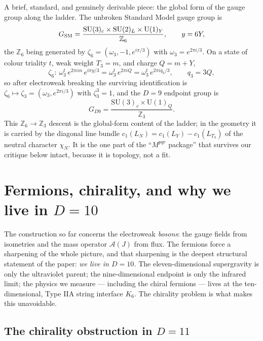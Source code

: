 \documentclass[11pt]{article}
\theoremstyle{plain}
\theoremstyle{definition}
\newcommand{\cA}{\mathcal{A}}
\newcommand{\Z}{\mathbb{Z}}
\newcommand{\SU}{\mathrm{SU}}
\newcommand{\U}{\mathrm{U}}
\begin{document}
A brief, standard, and genuinely derivable piece: the global form of the
gauge group along the ladder. The unbroken Standard Model gauge group is
\begin{equation}
G_{\rm SM}=\frac{\SU(3)_c\times\SU(2)_L\times\U(1)_Y}{\Z_6},
\qquad y=6Y,
\end{equation}
the $\Z_6$ being generated by
$\zeta_6=(\omega_3,-1,e^{i\pi/3})$ with $\omega_3=e^{2\pi i/3}$. On a state
of colour triality $t$, weak weight $T_3=m$, and charge $Q=m+Y$,
\begin{equation}
\zeta_6:\ \omega_3^{t}\,e^{2\pi i m}\,e^{i\pi y/3}
=\omega_3^{t}\,e^{2\pi i Q}
=\omega_3^{t}\,e^{2\pi i q_3/3},\qquad q_3=3Q,
\end{equation}
so after electroweak breaking the surviving identification is
$\zeta_6\mapsto\zeta_3=(\omega_3,e^{2\pi i/3})$ with $\zeta_3^3=1$, and the
$D=9$ endpoint group is
\begin{equation}
G_{D9}=\frac{\SU(3)_c\times\U(1)_Q}{\Z_3}.
\end{equation}
This $\Z_6\to\Z_3$ descent is the global-form content of the ladder; in the
geometry it is carried by the diagonal line bundle
$c_1(L_N)=c_1(L_Y)-c_1(L_{T_3})$ of the neutral character $\chi_N$. It is
the one part of the ``$M^{pqr}$ package'' that survives our critique below
intact, because it is topology, not a fit.

\section{Fermions, chirality, and why we live in $D=10$}
\label{sec:fermions}

The construction so far concerns the electroweak \emph{bosons}: the gauge
fields from isometries and the mass operator $\cA(J)$ from flux. The fermions
force a sharpening of the whole picture, and that sharpening is the deepest
structural statement of the paper: \emph{we live in $D=10$.} The
eleven-dimensional supergravity is only the ultraviolet parent; the
nine-dimensional endpoint is only the infrared limit; the physics we measure
--- including the chiral fermions --- lives at the ten-dimensional, Type IIA
string interface $K_6$. The chirality problem is what makes this unavoidable.

\subsection{The chirality obstruction in $D=11$}
\end{document}
